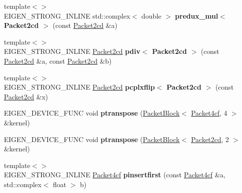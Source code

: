 \begin{DoxyCompactItemize}
{\footnotesize template$<$$>$ }\\E\+I\+G\+E\+N\+\_\+\+S\+T\+R\+O\+N\+G\+\_\+\+I\+N\+L\+I\+NE std\+::complex$<$ double $>$ {\bfseries predux\+\_\+mul$<$ Packet2cd $>$} (const \hyperlink{struct_eigen_1_1internal_1_1_packet2cd}{Packet2cd} \&a)
\item 
\mbox{\label{namespace_eigen_1_1internal_a64259468f24e10dfa65cca4689c2b52a}} 
{\footnotesize template$<$$>$ }\\E\+I\+G\+E\+N\+\_\+\+S\+T\+R\+O\+N\+G\+\_\+\+I\+N\+L\+I\+NE \hyperlink{struct_eigen_1_1internal_1_1_packet2cd}{Packet2cd} {\bfseries pdiv$<$ Packet2cd $>$} (const \hyperlink{struct_eigen_1_1internal_1_1_packet2cd}{Packet2cd} \&a, const \hyperlink{struct_eigen_1_1internal_1_1_packet2cd}{Packet2cd} \&b)
\item 
\mbox{\label{namespace_eigen_1_1internal_a1f7057a9e79face2457b6bf1850b4c23}} 
{\footnotesize template$<$$>$ }\\E\+I\+G\+E\+N\+\_\+\+S\+T\+R\+O\+N\+G\+\_\+\+I\+N\+L\+I\+NE \hyperlink{struct_eigen_1_1internal_1_1_packet2cd}{Packet2cd} {\bfseries pcplxflip$<$ Packet2cd $>$} (const \hyperlink{struct_eigen_1_1internal_1_1_packet2cd}{Packet2cd} \&x)
\item 
\mbox{\label{namespace_eigen_1_1internal_a33fce4d405f50aab65599f3bab3fe076}} 
E\+I\+G\+E\+N\+\_\+\+D\+E\+V\+I\+C\+E\+\_\+\+F\+U\+NC void {\bfseries ptranspose} (\hyperlink{struct_eigen_1_1internal_1_1_packet_block}{Packet\+Block}$<$ \hyperlink{struct_eigen_1_1internal_1_1_packet4cf}{Packet4cf}, 4 $>$ \&kernel)
\item 
\mbox{\label{namespace_eigen_1_1internal_a219ae6dc59131816934137096adeeefb}} 
E\+I\+G\+E\+N\+\_\+\+D\+E\+V\+I\+C\+E\+\_\+\+F\+U\+NC void {\bfseries ptranspose} (\hyperlink{struct_eigen_1_1internal_1_1_packet_block}{Packet\+Block}$<$ \hyperlink{struct_eigen_1_1internal_1_1_packet2cd}{Packet2cd}, 2 $>$ \&kernel)
\item 
\mbox{\label{namespace_eigen_1_1internal_a4e4eafb51675c17bd14345c900ad0374}} 
{\footnotesize template$<$$>$ }\\E\+I\+G\+E\+N\+\_\+\+S\+T\+R\+O\+N\+G\+\_\+\+I\+N\+L\+I\+NE \hyperlink{struct_eigen_1_1internal_1_1_packet4cf}{Packet4cf} {\bfseries pinsertfirst} (const \hyperlink{struct_eigen_1_1internal_1_1_packet4cf}{Packet4cf} \&a, std\+::complex$<$ float $>$ b)

\end{DoxyCompactItemize}
